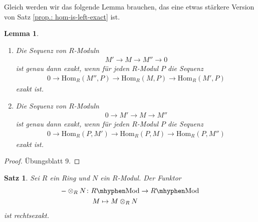 \documentclass[reqno,12pt]{article}
\numberwithin{equation}{section}
\newcommand{\Hom}{\text{Hom}}
\theoremstyle{plain}
\newtheorem{lemma}[thm]{Lemma}
\newtheorem{proposition}[thm]{Satz}
\theoremstyle{definition}
\newcommand{\blank}{{-}}
\newcommand{\Mod}{\text{Mod}}
\begin{document}
Gleich werden wir das folgende Lemma brauchen, das eine etwas stärkere Version von Satz \ref{prop.: hom-is-left-exact} ist.

\begin{lemma}\label{lemma: hom-is-left-exact-iff}
\
\begin{enumerate}
\item Die Sequenz von $R$-Moduln
\begin{align*}
M' \to M \to M'' \to 0
\end{align*}
ist genau dann exakt, wenn für jeden $R$-Modul $P$ die Sequenz
\begin{align*}
0 \to \Hom_R(M'',P) \to \Hom_R(M,P) \to \Hom_R(M',P)
\end{align*}
exakt ist.

\item Die Sequenz von $R$-Moduln
\begin{align*}
0 \to M' \to M \to M''
\end{align*}
ist genau dann exakt, wenn für jeden $R$-Modul $P$ die Sequenz
\begin{align*}
0 \to \Hom_R(P, M') \to \Hom_R(P, M) \to \Hom_R(P,M'')
\end{align*}
exakt ist.
\end{enumerate}
\end{lemma}

\begin{proof}
Übungsblatt 9.
\end{proof}


\begin{proposition}
Sei $R$ ein Ring und $N$ ein $R$-Modul. Der Funktor
\begin{align*}
& \blank \otimes_R N \colon R \mhyphen \Mod \to R \mhyphen \Mod \\
& \hspace{45pt} M \mapsto M \otimes_R N
\end{align*}
ist rechtsexakt.
\end{proposition}
\end{document}
